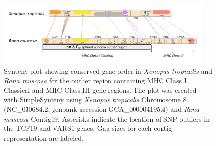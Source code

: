 \documentclass[9pt,twoside,lineno]{pnas-new-SI}
\begin{document}
\begin{figure}

{\centering \includegraphics[width=0.95\textwidth]{figures/synteny_figure.png}

}

\caption{\label{fig-synteny-plot}Synteny plot showing conserved gene
order in \emph{Xenopus tropicalis} and \emph{Rana muscosa} for the
outlier region containing MHC Class I Classical and MHC Class III gene
regions. The plot was created with SimpleSynteny \citep{veltri2016}
using \emph{Xenopus tropicalis} Chromosome 8 (NC\_030684.2, genbank
accession GCA\_000004195.4) and \emph{Rana muscosa} Contig19. Asterisks
indicate the location of SNP outliers in the TCF19 and VARS1 genes. Gap
sizes for each contig representation are labeled.}

\end{figure}\clearpage

\newpage
\end{document}
